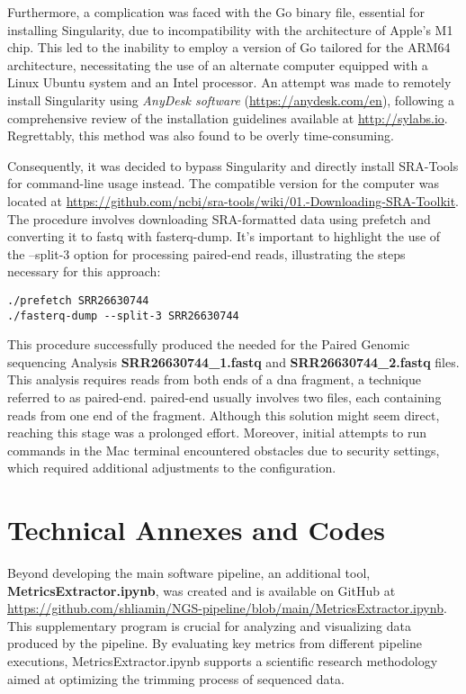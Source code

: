 Furthermore, a complication was faced with the Go binary file, essential for installing Singularity, due to incompatibility with the architecture of Apple's M1 chip. This led to the inability to employ a version of Go tailored for the ARM64 architecture, necessitating the use of an alternate computer equipped with a Linux Ubuntu system and an Intel processor. An attempt was made to remotely install Singularity using \textit{AnyDesk software} (\url{https://anydesk.com/en}), following a comprehensive review of the installation guidelines available at \url{http://sylabs.io}. Regrettably, this method was also found to be overly time-consuming.

Consequently, it was decided to bypass Singularity and directly install SRA-Tools for command-line usage instead. The compatible version for the computer was located at \url{https://github.com/ncbi/sra-tools/wiki/01.-Downloading-SRA-Toolkit}. The procedure involves downloading SRA-formatted data using prefetch and converting it to \gls{fastq} with fasterq-dump. It's important to highlight the use of the --split-3 option for processing paired-end \gls{read}s, illustrating the steps necessary for this approach:

\begin{verbatim}
./prefetch SRR26630744
./fasterq-dump --split-3 SRR26630744
\end{verbatim}

This procedure successfully produced the needed for the Paired Genomic \gls{sequencing} Analysis \textbf{SRR26630744\_1.fastq} and \textbf{SRR26630744\_2.fastq} files. This analysis requires \gls{read}s from both ends of a \gls{dna} fragment, a technique referred to as \gls{paired-end}. \gls{paired-end} usually involves two files, each containing reads from one end of the fragment. Although this solution might seem direct, reaching this stage was a prolonged effort. Moreover, initial attempts to run commands in the Mac terminal encountered obstacles due to security settings, which required additional adjustments to the configuration.


\section{Technical Annexes and Codes}

Beyond developing the main software pipeline, an additional tool, \textbf{MetricsExtractor.ipynb}, was created and is available on GitHub at \url{https://github.com/shliamin/NGS-pipeline/blob/main/MetricsExtractor.ipynb}. This supplementary program is crucial for analyzing and visualizing data produced by the pipeline. By evaluating key \gls{metrics} from different pipeline executions, MetricsExtractor.ipynb supports a scientific research methodology aimed at optimizing the \gls{trimming} process of sequenced data. 

